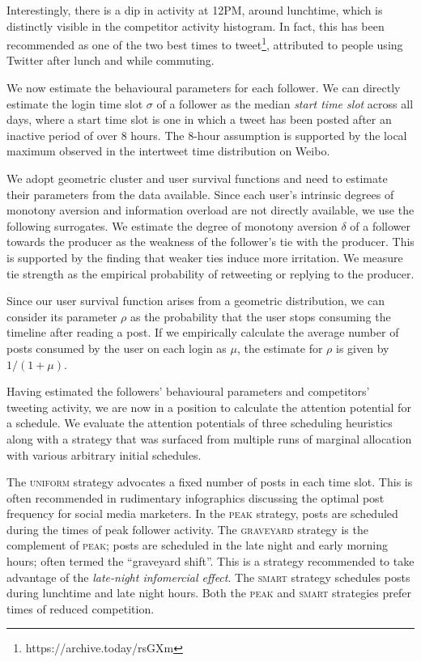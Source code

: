\documentclass[onesided,asymmetric]{tufte-book}
\begin{document}
Interestingly, there is a dip in activity at 12PM, around lunchtime, which is distinctly visible in the competitor activity histogram. In fact, this has been recommended as one of the two best times to tweet\footnote{https://archive.today/rsGXm}, attributed to people using Twitter after lunch and while commuting.

We now estimate the behavioural parameters for each follower. We can directly estimate the login time slot $\sigma$ of a follower as the median \textit{start time slot} across all days, where a start time slot is one in which a tweet has been posted after an inactive period of over 8 hours. The 8-hour assumption is supported by the local maximum observed in the intertweet time distribution on Weibo.

We adopt geometric cluster and user survival functions and need to estimate their parameters from the data available. Since each user's intrinsic degrees of monotony aversion and information overload are not directly available, we use the following surrogates. We estimate the degree of monotony aversion $\delta$ of a follower towards the producer as the weakness of the follower's tie with the producer. This is supported by the finding that weaker ties induce more irritation\cite{koroleva2011cognition}. We measure tie strength as the empirical probability of retweeting or replying to the producer.

Since our user survival function arises from a geometric distribution, we can consider its parameter $\rho$ as the probability that the user stops consuming the timeline after reading a post. If we empirically calculate the average number of posts consumed by the user on each login as $\mu$, the estimate for $\rho$ is given by $1 / (1 + \mu)$.

Having estimated the followers' behavioural parameters and competitors' tweeting activity, we are now in a position to calculate the attention potential for a schedule. We evaluate the attention potentials of three scheduling heuristics along with a strategy that was surfaced from multiple runs of marginal allocation with various arbitrary initial schedules.

The \textsc{uniform} strategy advocates a fixed number of posts in each time slot. This is often recommended in rudimentary infographics discussing the optimal post frequency for social media marketers. In the \textsc{peak} strategy, posts are scheduled during the times of peak follower activity. The \textsc{graveyard} strategy is the complement of \textsc{peak}; posts are scheduled in the late night and early morning hours; often termed the ``graveyard shift''. This is a strategy recommended to take advantage of the \textit{late-night infomercial effect}\footnotemark[5]. The \textsc{smart} strategy schedules posts during lunchtime and late night hours. Both the \textsc{peak} and \textsc{smart} strategies prefer times of reduced competition.
\end{document}
